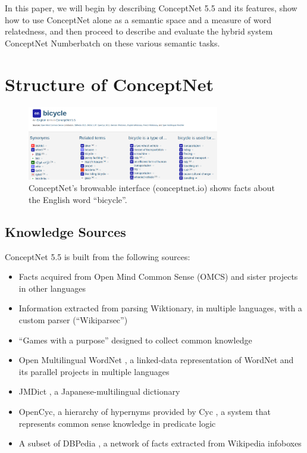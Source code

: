 \documentclass[letterpaper]{article}
\begin{document}
In this paper, we will begin by describing ConceptNet 5.5 and its features,
show how to use ConceptNet alone as a semantic space and a measure of word
relatedness, and then proceed to describe and evaluate the hybrid system
ConceptNet Numberbatch on these various semantic tasks.

\section{Structure of ConceptNet}\label{structure-of-conceptnet}

\begin{figure}[t]
\centering
\includegraphics[width=3.3in]{cn5-screenshot.png}
\caption{
    ConceptNet's browsable interface (conceptnet.io) shows
    facts about the English word ``bicycle''.
}
\label{screenshot}
\end{figure}

\subsection{Knowledge Sources}\label{knowledge-sources}

ConceptNet 5.5 is built from the following sources:

\begin{itemize}
\item
  Facts acquired from Open Mind Common Sense (OMCS) \cite{singh2002omcs}
  and sister projects in other languages \cite{anacleto2006portuguese}
\item
  Information extracted from parsing Wiktionary, in multiple languages,
  with a custom parser (``Wikiparsec'')
\item
  ``Games with a purpose'' designed to collect common knowledge
  \cite{vonahn2006verbosity} \cite{nakahara2011nadya} \cite{kuo2009petgame}
\item
  Open Multilingual WordNet \cite{bond2013linking}, a linked-data
  representation of WordNet \cite{miller1998wordnet} and its parallel
  projects in multiple languages
\item
  JMDict \cite{breen2004jmdict}, a Japanese-multilingual dictionary
\item
  OpenCyc, a hierarchy of hypernyms provided by
  Cyc \cite{lenat1989cyc}, a system that represents common sense knowledge in predicate logic
\item
  A subset of DBPedia \cite{auer2007dbpedia}, a network of facts
  extracted from Wikipedia infoboxes
\end{itemize}
\end{document}
